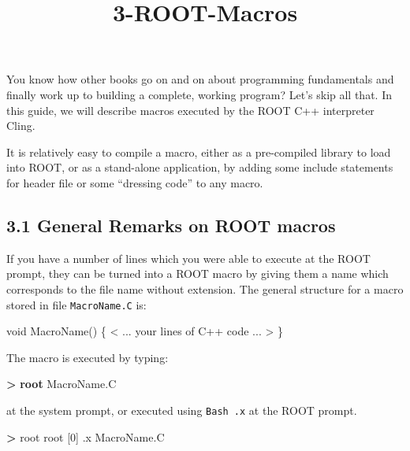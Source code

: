 \documentclass{article}
\title{3-ROOT-Macros}
\newenvironment{Shaded}{}{}
\newcommand{\KeywordTok}[1]{\textcolor[rgb]{0.00,0.44,0.13}{\textbf{{#1}}}}
\newcommand{\DataTypeTok}[1]{\textcolor[rgb]{0.56,0.13,0.00}{{#1}}}
\newcommand{\NormalTok}[1]{{#1}}
\begin{document}
    
    
    \maketitle
    
    

    
    You know how other books go on and on about programming fundamentals and
finally work up to building a complete, working program? Let's skip all
that. In this guide, we will describe macros executed by the ROOT C++
interpreter Cling.

It is relatively easy to compile a macro, either as a pre-compiled
library to load into ROOT, or as a stand-alone application, by adding
some include statements for header file or some ``dressing code'' to any
macro.

\subsection{3.1 General Remarks on ROOT
macros}\label{general-remarks-on-root-macros}

If you have a number of lines which you were able to execute at the ROOT
prompt, they can be turned into a ROOT macro by giving them a name which
corresponds to the file name without extension. The general structure
for a macro stored in file \texttt{MacroName.C} is:

\begin{Shaded}
\begin{Highlighting}[]
\DataTypeTok{void} \NormalTok{MacroName() \{}
        \NormalTok{<          ...}
          \NormalTok{your lines of C++ code}
                   \NormalTok{...             >}
\NormalTok{\}}
\end{Highlighting}
\end{Shaded}

The macro is executed by typing:

\begin{Shaded}
\begin{Highlighting}[]
 \KeywordTok{>} \KeywordTok{root} \NormalTok{MacroName.C}
\end{Highlighting}
\end{Shaded}

at the system prompt, or executed using \texttt{Bash\ .x} at the ROOT
prompt.

\begin{Shaded}
\begin{Highlighting}[]
 \KeywordTok{>} \NormalTok{root }
 \NormalTok{root [0] .x MacroName.C}
\end{Highlighting}
\end{Shaded}
\end{document}
